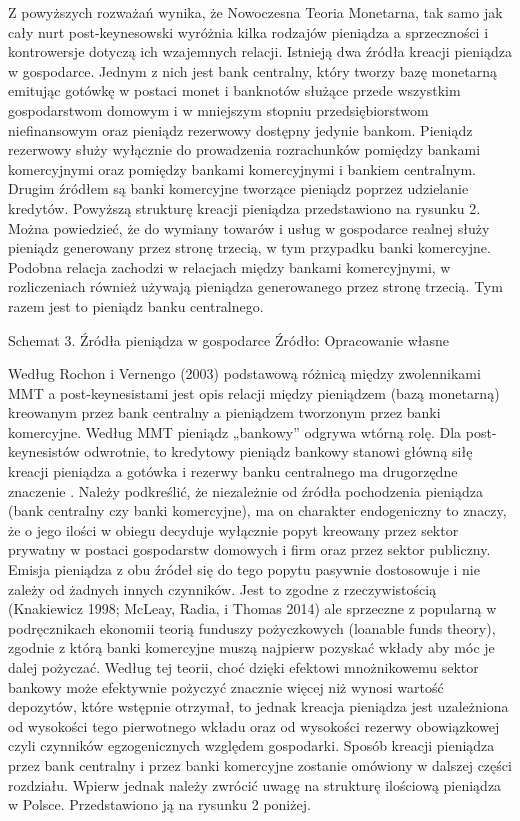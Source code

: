 \documentclass[
]{book}
\begin{document}
Z powyższych rozważań wynika, że Nowoczesna Teoria Monetarna, tak samo jak cały nurt post-keynesowski wyróżnia kilka rodzajów pieniądza a sprzeczności i kontrowersje dotyczą ich wzajemnych relacji. Istnieją dwa źródła kreacji pieniądza w gospodarce. Jednym z nich jest bank centralny, który tworzy bazę monetarną emitując gotówkę w postaci monet i banknotów służące przede wszystkim gospodarstwom domowym i w mniejszym stopniu przedsiębiorstwom niefinansowym oraz pieniądz rezerwowy dostępny jedynie bankom. Pieniądz rezerwowy służy wyłącznie do prowadzenia rozrachunków pomiędzy bankami komercyjnymi oraz pomiędzy bankami komercyjnymi i bankiem centralnym. Drugim źródłem są banki komercyjne tworzące pieniądz poprzez udzielanie kredytów. Powyższą strukturę kreacji pieniądza przedstawiono na rysunku 2. Można powiedzieć, że do wymiany towarów i usług w gospodarce realnej służy pieniądz generowany przez stronę trzecią, w tym przypadku banki komercyjne. Podobna relacja zachodzi w relacjach między bankami komercyjnymi, w rozliczeniach również używają pieniądza generowanego przez stronę trzecią. Tym razem jest to pieniądz banku centralnego.

Schemat 3. Źródła pieniądza w gospodarce
Źródło: Opracowanie własne

Według Rochon i Vernengo (2003) podstawową różnicą między zwolennikami MMT a post-keynesistami jest opis relacji między pieniądzem (bazą monetarną) kreowanym przez bank centralny a pieniądzem tworzonym przez banki komercyjne. Według MMT pieniądz „bankowy'' odgrywa wtórną rolę. Dla post-keynesistów odwrotnie, to kredytowy pieniądz bankowy stanowi główną siłę kreacji pieniądza a gotówka i rezerwy banku centralnego ma drugorzędne znaczenie .
Należy podkreślić, że niezależnie od źródła pochodzenia pieniądza (bank centralny czy banki komercyjne), ma on charakter endogeniczny to znaczy, że o jego ilości w obiegu decyduje wyłącznie popyt kreowany przez sektor prywatny w postaci gospodarstw domowych i firm oraz przez sektor publiczny. Emisja pieniądza z obu źródeł się do tego popytu pasywnie dostosowuje i nie zależy od żadnych innych czynników. Jest to zgodne z rzeczywistością (Knakiewicz 1998; McLeay, Radia, i Thomas 2014) ale sprzeczne z popularną w podręcznikach ekonomii teorią funduszy pożyczkowych (loanable funds theory), zgodnie z którą banki komercyjne muszą najpierw pozyskać wkłady aby móc je dalej pożyczać. Według tej teorii, choć dzięki efektowi mnożnikowemu sektor bankowy może efektywnie pożyczyć znacznie więcej niż wynosi wartość depozytów, które wstępnie otrzymał, to jednak kreacja pieniądza jest uzależniona od wysokości tego pierwotnego wkładu oraz od wysokości rezerwy obowiązkowej czyli czynników egzogenicznych względem gospodarki.
Sposób kreacji pieniądza przez bank centralny i przez banki komercyjne zostanie omówiony w dalszej części rozdziału. Wpierw jednak należy zwrócić uwagę na strukturę ilościową pieniądza w Polsce. Przedstawiono ją na rysunku 2 poniżej.
\end{document}
